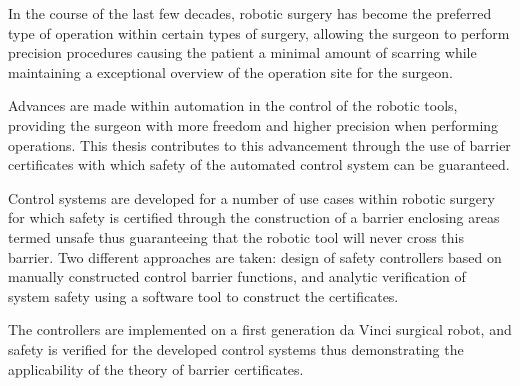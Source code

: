 In the course of the last few decades, robotic sur\-gery has become the  preferred type of operation within certain types of surgery, allowing the surgeon to perform precision procedures causing the patient a minimal amount of scarring while maintaining a exceptional overview of the operation site for the surgeon.


Advances are made within automation in the control of the robotic tools, providing the surgeon with more freedom and higher precision when performing operations. This thesis contributes to this advancement  through the use of barrier certificates with which safety of the automated control system can be guaranteed.


Control systems are developed for a number of use cases within robotic surgery for which safety  is certified through the construction of a barrier enclosing areas termed unsafe thus guaranteeing that the robotic tool will never cross this barrier. Two different approaches are taken: design of safety controllers based on manually constructed control barrier functions, and analytic verification of system safety using a software tool to construct the certificates.


The controllers are implemented on a first generation da Vinci surgical robot, and safety is verified for the developed control systems thus demonstrating the applicability of the theory of barrier certificates.


